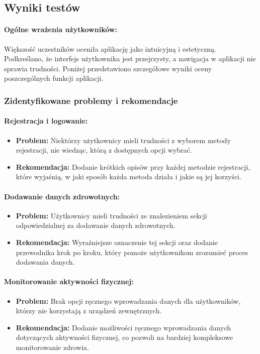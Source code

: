 \begin{center}
  \subsection{Wyniki testów}
\end{center}

\paragraph{Ogólne wrażenia użytkowników:} Większość uczestników oceniła aplikację jako intuicyjną i estetyczną. Podkreślano, że interfejs użytkownika jest przejrzysty, a nawigacja w aplikacji nie sprawia trudności. Poniżej przedstawiono szczegółowe wyniki oceny poszczególnych funkcji aplikacji.

\subsubsection{Zidentyﬁkowane problemy i rekomendacje}

\paragraph{Rejestracja i logowanie:}
\begin{itemize}
  \item \textbf{Problem:} Niektórzy użytkownicy mieli trudności z wyborem metody rejestracji, nie wiedząc, którą z dostępnych opcji wybrać.
  \item \textbf{Rekomendacja:} Dodanie krótkich opisów przy każdej metodzie rejestracji, które wyjaśnią, w jaki sposób każda metoda działa i jakie są jej korzyści.
\end{itemize}

\paragraph{Dodawanie danych zdrowotnych:}
\begin{itemize}
  \item \textbf{Problem:} Użytkownicy mieli trudności ze znalezieniem sekcji odpowiedzialnej za dodawanie danych zdrowotnych.
  \item \textbf{Rekomendacja:} Wyraźniejsze oznaczenie tej sekcji oraz dodanie przewodnika krok po kroku, który pomoże użytkownikom zrozumieć proces dodawania danych.
\end{itemize}

\paragraph{Monitorowanie aktywności ﬁzycznej:}
\begin{itemize}
  \item \textbf{Problem:} Brak opcji ręcznego wprowadzania danych dla użytkowników, którzy nie korzystają z urządzeń zewnętrznych.
  \item \textbf{Rekomendacja:} Dodanie możliwości ręcznego wprowadzania danych dotyczących aktywności ﬁzycznej, co pozwoli na bardziej kompleksowe monitorowanie zdrowia.
\end{itemize}

